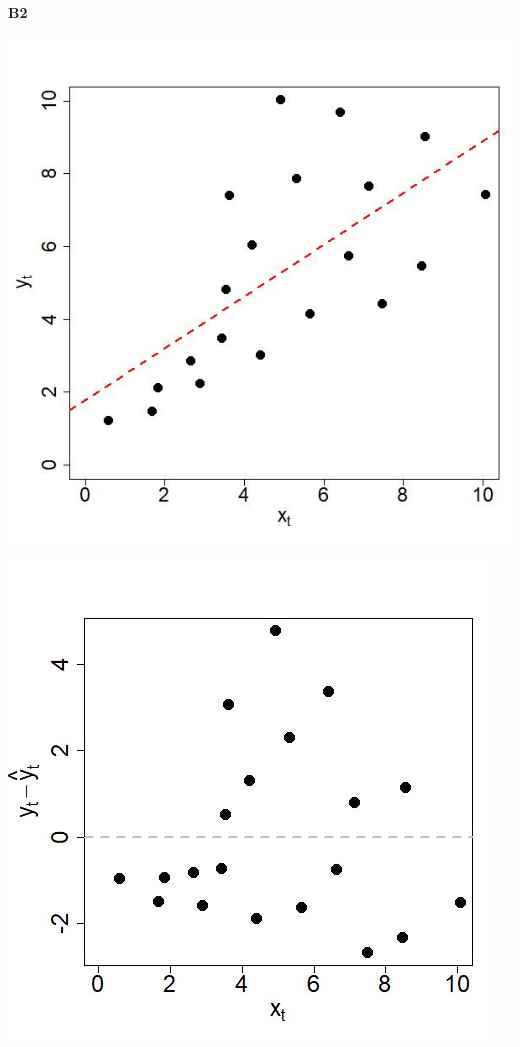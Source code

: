 \documentclass[captions=tableheading, 12pt, headings=small, parskip=half]{scrartcl}
\begin{document}
\begin{enumerate}[label = \alph*)]
{		\begin{minipage}{0.05\columnwidth}
		\begin{center}
			\Large \textbf{B2}
		\end{center}
		\end{minipage}
		\hfill
		\begin{minipage}{0.46\columnwidth}
			\includegraphics[width= \columnwidth]{Code1/B2.jpeg}
		\end{minipage}
		\hfill
		\begin{minipage}{0.46\columnwidth}
			\includegraphics[width= \columnwidth]{Code1/B2_res.jpeg}
		\end{minipage}

}
\end{enumerate}
\end{document}
